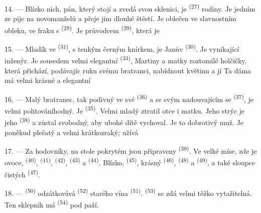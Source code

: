 14. --- Blízko nich, pán, který stojí a zvedá svou sklenici, je 
\textsuperscript{(27)} rodiny. Je jedním ze 
 pije na  novomanželů a přeje jim dlouhé štěstí. Je
oblečen ve slavnostním obleku, ve fraku s  \textsuperscript{(28)}. Je
průvodcem  \textsuperscript{(29)}, která je

15. --- Mladík ve  \textsuperscript{(31)}, s tenkým černým knírkem, je Janův
 \textsuperscript{(30)}. Je vynikající inženýr. Je sousedem velmi elegantní
 \textsuperscript{(33)}, Martiny  a matky roztomilé
holčičky, která přichází, podávajíc ruku svému bratranci, nabídnout květinu a 
jí  Ta dáma má velmi krásné
 a elegantní 

16. --- Malý bratranec, tak podivný ve své  \textsuperscript{(36)} a se svým
nadouvajícím se  \textsuperscript{(37)}, je velmi politováníhodný. Je
 \textsuperscript{(35)}. Velmi mladý ztratil otce i matku. Jeho strýc je jeho
 \textsuperscript{(38)} a zůstal svobodný, aby ubohé dítě vychoval. Je to
dobrotivý muž. Je poněkud plešatý a velmi krátkozraký; užívá

\VUsaut{2.4mm}
\VUsaut{3.0mm}

17. --- Za hodovníky, na stole pokrytém  jsou připraveny
 \textsuperscript{(39)}. Ve velké míse, zde je ovoce,
 \textsuperscript{(40)},  \textsuperscript{(41)},
 \textsuperscript{(42)},  \textsuperscript{(43)} a
 \textsuperscript{(44)}. Blízko, 
\textsuperscript{(45)}, krásný  \textsuperscript{(46)}, 
\textsuperscript{(48)} a  \textsuperscript{(49)}, a také sloupce čistých
 \textsuperscript{(47)}.

18. ---  \textsuperscript{(50)} odzátkovává 
\textsuperscript{(52)} starého vína  \textsuperscript{(51)}.
 \textsuperscript{(53)} se zdá velmi těžko vytažitelná. Ten
sklepník má  \textsuperscript{(54)} pod paží.

